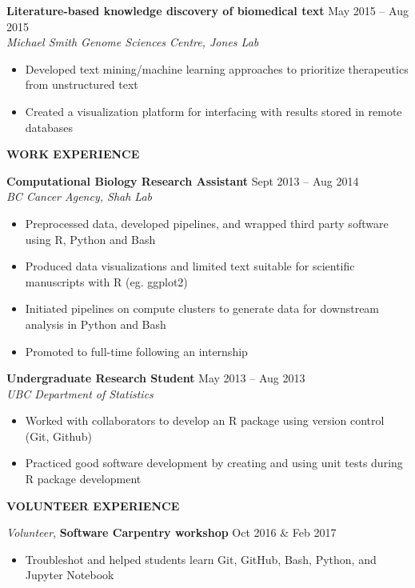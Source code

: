 \documentclass{res}
\renewcommand{\section}[1]{%
  \vspace{0.3in}%
  \centerline{\uppercase{\bf{#1}}}%
  \vspace{-6pt}}
\newcommand{\linehead}[2]{%
  {\bf #1} \hfill #2\\}
\newcommand{\linetitle}[1]{%
  {\sl #1}}
\newcommand{\linevolunteer}[3]{%
  {\sl #3}, {\bf #2} \hfill #1}%
\begin{document}
\begin{resume}
\linehead{Literature-based knowledge discovery of biomedical text}{May 2015 -- Aug 2015}
\linetitle{Michael Smith Genome Sciences Centre, Jones Lab}
\begin{itemize}
  \item Developed text mining/machine learning approaches to prioritize therapeutics from unstructured text
  \item Created a visualization platform for interfacing with results stored in remote databases
\end{itemize}

\section{Work Experience}

{\bf Computational Biology Research Assistant} \hfill Sept 2013 -- Aug 2014\\
{\it BC Cancer Agency, Shah Lab}
\begin{itemize}
  \item Preprocessed data, developed pipelines, and wrapped third party software using R, Python and Bash
  \item Produced data visualizations and limited text suitable for scientific manuscripts with R (eg. ggplot2)
  \item Initiated pipelines on compute clusters to generate data for downstream analysis in Python and Bash
  \item Promoted to full-time following an internship
\end{itemize}

{\bf Undergraduate Research Student} \hfill May 2013 -- Aug 2013\\
{\it UBC Department of Statistics}
\begin{itemize}
  \item Worked with collaborators to develop an R package using version control (Git, Github)
  \item Practiced good software development by creating and using unit tests during R package development
\end{itemize}

\section{Volunteer experience}
\linevolunteer{Oct 2016 \& Feb 2017}{%
  Software Carpentry workshop}{%
  Volunteer}
\begin{itemize}
  \item Troubleshot and helped students learn Git, GitHub, Bash, Python, and Jupyter Notebook
\end{itemize}


\end{resume}
\end{document}
